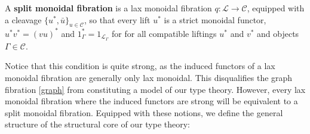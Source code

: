 \begin{defn}
 A \textbf{split monoidal fibration} is a lax monoidal fibration $q : \mathcal{L} \to \mathcal{C}$, equipped with a cleavage  $\{ u^*, \bar u \}_{u \in \mathcal{C}}$, so that every lift $u^*$ is a strict monoidal functor, $u^*v^* = (vu)^*$ and $1_\Gamma^* = 1_{\mathcal{L}_\Gamma}$ for  for all compatible liftings $u^*$ and $v^*$ and objects $\Gamma \in \mathcal{C}$.
\end{defn}
Notice that this condition is quite strong, as the induced functors of a lax monoidal fibration are generally only lax monoidal. This disqualifies the graph fibration \ref{graph} from constituting a model of our type theory. However, every lax monoidal fibration where the induced functors are strong will be equivalent to a split monoidal fibration. Equipped with these notions, we define the general structure of the structural core of our type theory:

